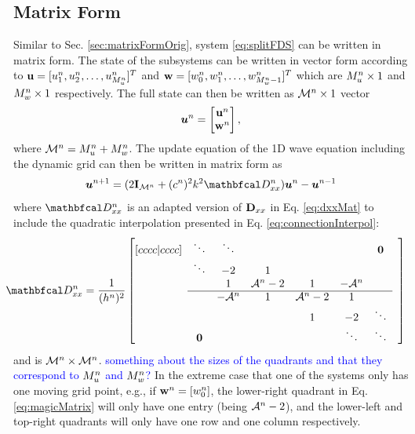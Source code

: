 \documentclass[fleqn]{jaes}
\def\SWcomment[#1]{\textcolor{blue}{#1}}
\begin{document}
\subsection{Matrix Form}\label{sec:matrixForm}
Similar to Sec. \ref{sec:matrixFormOrig}, system \eqref{eq:splitFDS} can be written in matrix form. The state of the subsystems can be written in vector form according to $\mathbf{u} = [u_1^n, u_2^n, \hdots, u_{M_u^n}^n]^T$ and $\mathbf{w} = [w_0^n, w_1^n, \hdots, w_{M_w^n-1}^n]^T$ which are $M_u^n \times 1$ and $M_w^n \times 1$ respectively. The full state can then be written as ${\mathcal{M}^n} \times 1$ vector
\begin{equation}\label{eq:uStack}
    \uStack^n = \begin{bmatrix}
    \u^n\\
    \w^n
    \end{bmatrix},
\end{equation}
where ${\mathcal{M}^n} = M_u^n + M_w^n$.
The update equation of the 1D wave equation including the dynamic grid can then be written in matrix form as
\begin{equation}\label{eq:1DwaveDynMatrix}
    \uStack^{n+1} = (2\I_\MoneD + (c^n)^2k^2\DDxx)\uStack^n - \uStack^{n-1} 
\end{equation}
where $\DDxx$ is an adapted version of $\mathbf{D}_{xx}$ in Eq. \eqref{eq:dxxMat} to include the quadratic interpolation presented in Eq. \eqref{eq:connectionInterpol}:
\begin{equation}\label{eq:magicMatrix}
    \!\!\!\!\!\!\DDxx = \frac{1}{(h^n)^2}\begin{bmatrix}[cccc|cccc]
     & \ddots  &\ddots & & & & \boldsymbol{0} & \\
       & \ddots & -2 & 1 & & & & \\
      & & 1 & \Aterm -2 & 1 & -\Aterm & \\ \cline{2-7}
      & & -\Aterm & 1 & \Aterm -2 & 1 & & \\
         & & & &1 & -2 & \ddots  \\
         & \boldsymbol{0} & &  &  &\ddots & \ddots &
    \end{bmatrix}
\end{equation}
and is ${\mathcal{M}^n} \times {\mathcal{M}^n}$. \SWcomment[something about the sizes of the quadrants and that they correspond to $M_u^n$ and $M_w^n$?] In the extreme case that one of the systems only has one moving grid point, e.g., if $\mathbf{w}^n =[w_0^n]$, the lower-right quadrant in Eq. \eqref{eq:magicMatrix} will only have one entry (being $\mathcal{A}^n-2$), and the lower-left and top-right quadrants will only have one row and one column respectively. 
\end{document}
